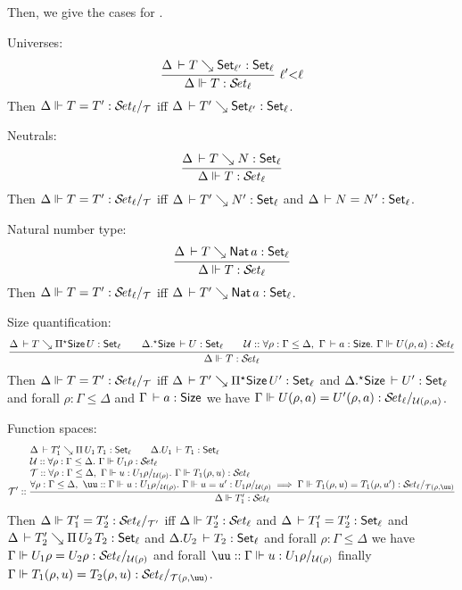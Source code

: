 \documentclass[acmlarge,review,anonymous]{acmart}\settopmatter{printfolios=true}
\begin{document}
Then, we give the cases for .
\begin{caselist}

\nextcase Universes:
\[
  \rux{\Delta \der T \evalsto \Set[\ell'] : \Set[\ell]
     }{\sty \Delta T \ell
     }{\ell' {<} \ell}
\]
Then $\steqd \Delta T {T'} \ell {\T}$ iff $\Delta \der T' \evalsto \Set[\ell'] : \Set[\ell]$.

\nextcase Neutrals:
\[
  \ru{\Delta \der T \evalsto N : \Set[\ell]
    }{\sty \Delta T \ell}
\]
Then $\steqd \Delta T {T'} \ell {\T}$ iff $\Delta \der T' \evalsto N' : \Set[\ell]$ and
$\Delta \der N = N' : \Set[\ell]$.

\nextcase Natural number type:
\[
  \ru{\Delta \der T \evalsto \Nat a : \Set[\ell]
    }{\sty \Delta T \ell}
\]
Then $\steqd \Delta T {T'} \ell {\T}$ iff $\Delta \der T' \evalsto \Nat a : \Set[\ell]$.

\nextcase Size quantification:
\[
  \rul{\Delta \der T \evalsto \epiT \Size U : \Set[\ell] \qquad
       \eext \Delta \Size \der U : \Set[\ell] \qquad
      \U :: \forall \rho : \Gamma \leq \Delta,~\Gamma \der a : \Size.~
        \sty \Gamma {U(\rho,a)} \ell \\
    }{\sty \Delta {T} \ell}
\]
Then $\steqd \Delta T {T'} \ell {\T}$
iff %
$\Delta \der T' \evalsto \epiT \Size {U'} : \Set[\ell]$
and $\eext \Delta \Size \der U' : \Set[\ell]$
and forall $\rho : \Gamma \leq \Delta$ and $\Gamma \der a : \Size$
we have $\steqd \Gamma {U(\rho,a)} {U'(\rho,a)} \ell {\U(\rho,a)}$.

\nextcase Function spaces:
\[
  \T' ::
  \rul{\Delta \der T_1' \evalsto \piT {U_1} {T_1} : \Set[\ell] \qquad \cext \Delta U_1 \der T_1 : \Set[\ell] \\ \relax
      \U :: \forall \rho : \Gamma \leq \Delta.~ \sty{\Gamma}{U_1\rho} {\ell} \\ \relax
      \T :: \forall \rho : \Gamma \leq \Delta,~\sttmd \Gamma u {U_1\rho} {\U(\rho)}.~
        \sty \Gamma {T_1(\rho,u)} \ell \\
      \forall \rho : \Gamma \leq \Delta,~ \uu :: \sttmd \Gamma u {U_1\rho} {\U(\rho)}.~
        \sttmeqd \Gamma u {u'} {U_1\rho} {\U(\rho)} {\uu} \implies
        \steqd \Gamma {T_1(\rho,u)} {T_1(\rho,u')} \ell {\T(\rho,\uu)}
    }{\sty \Delta {T_1'} \ell}
\]
Then $\steqd \Delta {T_1'} {T_2'} \ell {\T'}$
iff $\sty \Delta {T_2'} \ell$
and $\Delta \der T_1' = T_2' : \Set[\ell]$
and $\Delta \der T_2' \evalsto \piT{U_2}{T_2} : \Set[\ell]$
and $\cext \Delta{U_2} \der T_2 : \Set[\ell]$
and forall $\rho : \Gamma \leq \Delta$
we have $\steqd \Gamma {U_1\rho} {U_2\rho} \ell {\U(\rho)}$
and forall $\uu :: \sttmd \Gamma u {U_1\rho} {\U(\rho)}$
finally $\steqd \Gamma {T_1(\rho,u)} {T_2(\rho,u)} \ell {\T(\rho,\uu)}$.

\end{caselist}
\end{document}
